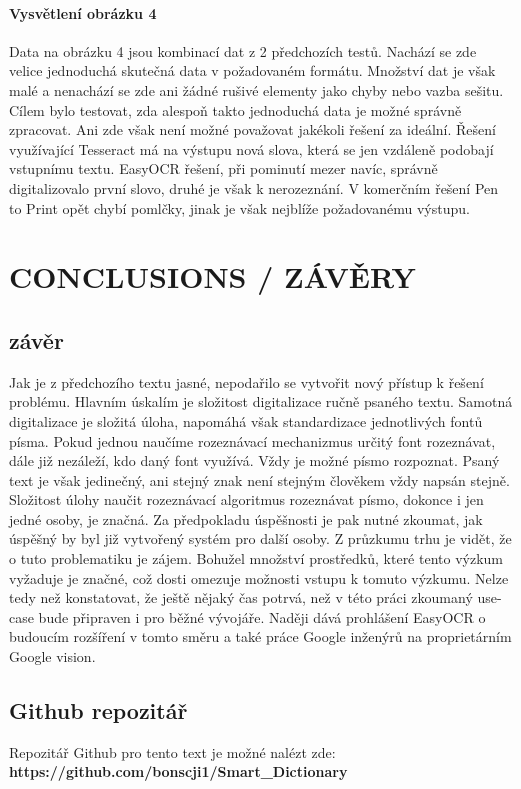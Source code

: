 \documentclass[journal]{IEEEtran}
\begin{document}
\paragraph{Vysvětlení obrázku 4}
Data na obrázku 4 jsou kombinací dat z 2 předchozích testů.
Nachází se zde velice jednoduchá skutečná data v požadovaném formátu.
Množství dat je však malé a nenachází se zde ani žádné rušivé elementy jako chyby nebo vazba sešitu.
Cílem bylo testovat, zda alespoň takto jednoduchá data je možné správně zpracovat.
Ani zde však není možné považovat jakékoli řešení za ideální.
Řešení využívající Tesseract má na výstupu nová slova, která se jen vzdáleně podobají vstupnímu textu.
EasyOCR řešení, při pominutí mezer navíc, správně digitalizovalo první slovo,  druhé je však k nerozeznání.
V komerčním řešení Pen to Print opět chybí pomlčky, jinak je však nejblíže požadovanému výstupu.


\section{CONCLUSIONS / ZÁVĚRY}
\subsection{závěr}
Jak je z předchozího textu jasné, nepodařilo se vytvořit nový přístup k řešení problému.
Hlavním úskalím je složitost digitalizace ručně psaného textu.
Samotná digitalizace je složitá úloha, napomáhá však standardizace jednotlivých fontů písma.
Pokud jednou naučíme rozeznávací mechanizmus určitý font rozeznávat, dále již nezáleží, kdo daný font využívá.
Vždy je možné písmo rozpoznat.
Psaný text je však jedinečný, ani stejný znak není stejným člověkem vždy napsán stejně.
Složitost úlohy naučit rozeznávací algoritmus rozeznávat písmo, dokonce i jen jedné osoby, je značná.
Za předpokladu úspěšnosti je pak nutné zkoumat, jak úspěšný by byl již vytvořený systém pro další osoby.
Z průzkumu trhu je vidět, že o tuto problematiku je zájem.
Bohužel množství prostředků, které tento výzkum vyžaduje je značné, což dosti omezuje možnosti vstupu k tomuto výzkumu.
Nelze tedy než konstatovat, že ještě nějaký čas potrvá, než v této práci zkoumaný use-case bude připraven i pro běžné vývojáře.
Naději dává prohlášení EasyOCR o budoucím rozšíření v tomto směru a také práce Google inženýrů na proprietárním Google vision.

\subsection{Github repozitář}
Repozitář Github pro tento text je možné nalézt zde: \textbf{https://github.com/bonscji1/Smart_Dictionary}



\printbibliography

\printacronyms


\end{document}
